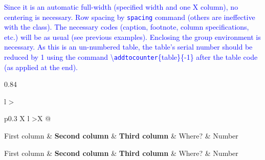 \documentclass[phd,showframe]{ndsu-thesis-2022}
\newcommand\italk[1]{\textcolor{blue}{#1}}  %
\newcommand\cmd[1]{\textbackslash\texttt{#1}}  %
\begin{document}
\italk{Since it is an automatic full-width (specified width and one X column), no centering is necessary. Row spacing by \texttt{spacing} command (others are ineffective with the class). The necessary codes (caption, footnote, column specifications, etc.) will be as usual (see previous examples). Enclosing the group environment is necessary. As this is an un-numbered table, the table's serial number should be reduced by 1 using the command \cmd{addtocounter}\{table\}\{-1\} after the table code (as applied at the end).}


\begingroup

\newcommand{\heads}{
\toprule
First column & \textbf{Second column} & \textbf{Third column} & Where? & Number\\
\midrule
}

\begin{spacing}{0.84}

\begin{xltabular}{\textwidth}{l >{\raggedright\arraybackslash}p{0.3\textwidth} X l  >{\raggedleft\arraybackslash}X @{}} 

\heads \endfirsthead 

\heads \endhead 

\endfoot 

\\[-0.4in]%
\endlastfoot


\end{xltabular}
\end{spacing}
\end{document}
